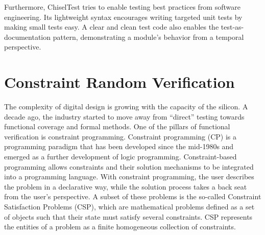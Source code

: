 \documentclass[conference]{IEEEtran}
\begin{document}
Furthermore, ChiselTest tries to enable testing best practices from software engineering.
Its lightweight syntax encourages writing targeted unit tests by making small tests easy.
A clear and clean test code also enables the test-as-documentation pattern,
demonstrating a module's behavior from a temporal perspective.



\section{Constraint Random Verification}
The complexity of digital design is growing with the capacity of the silicon. A decade ago, the industry started to move away from ``direct''
testing towards functional coverage and formal methods. One of the pillars of functional verification is constraint programming.
Constraint programming (CP) is a programming paradigm that has been developed since the mid-1980s and emerged as a further development of logic
programming. Constraint-based programming allows constraints and their solution mechanisms to be integrated into a programming language.
With constraint programming, the user describes the problem in a declarative way, while the solution process takes a back seat from the user's
perspective. A subset of these problems is the so-called Constraint Satisfaction Problems (CSP), which are mathematical problems defined as a
set of objects such that their state must satisfy several constraints. CSP represents the entities of a problem as a finite homogeneous
collection of constraints.
\end{document}

